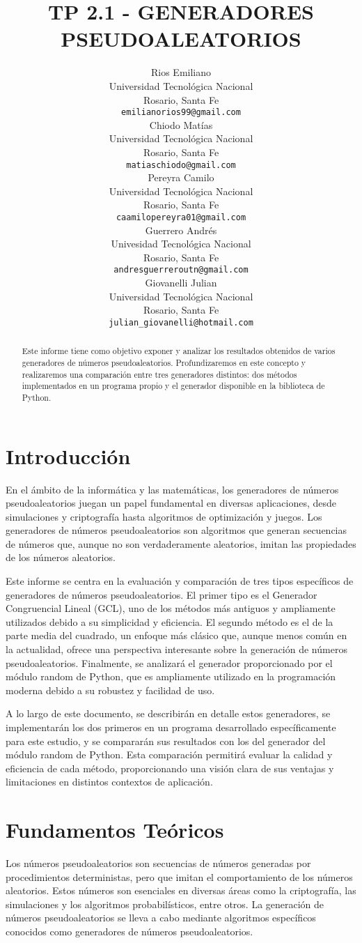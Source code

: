 \documentclass{article}
\title{TP 2.1 - GENERADORES PSEUDOALEATORIOS}
\author{
  Rios Emiliano\\
  Universidad Tecnológica Nacional\\
  Rosario, Santa Fe  \\
  \texttt{emilianorios99@gmail.com} \\
  \And
  Chiodo Matías\\
  Universidad Tecnológica Nacional\\
  Rosario, Santa Fe  \\
  \texttt{matiaschiodo@gmail.com} \\
  \And
  Pereyra Camilo\\
  Universidad Tecnológica Nacional\\
  Rosario, Santa Fe\\
  \texttt{caamilopereyra01@gmail.com} \\
  \And
  Guerrero Andrés\\
  Univesidad Tecnológica Nacional\\
  Rosario, Santa Fe \\
  \texttt {andresguerreroutn@gmail.com} \\
  \And
  Giovanelli Julian\\
  Universidad Tecnológica Nacional\\
  Rosario, Santa Fe  \\
  \texttt{julian\_giovanelli@hotmail.com} \\
}
\begin{document}
\maketitle
\begin{abstract}
Este informe tiene como objetivo exponer y analizar los resultados obtenidos de varios generadores de números pseudoaleatorios. Profundizaremos en este concepto y realizaremos una comparación entre tres generadores distintos: dos métodos implementados en un programa propio y el generador disponible en la biblioteca de Python.
\end{abstract}

\section{Introducción}

En el ámbito de la informática y las matemáticas, los generadores de números pseudoaleatorios juegan un papel fundamental en diversas aplicaciones, desde simulaciones y criptografía hasta algoritmos de optimización y juegos. Los generadores de números pseudoaleatorios son algoritmos que generan secuencias de números que, aunque no son verdaderamente aleatorios, imitan las propiedades de los números aleatorios.

Este informe se centra en la evaluación y comparación de tres tipos específicos de generadores de números pseudoaleatorios. El primer tipo es el Generador Congruencial Lineal (GCL), uno de los métodos más antiguos y ampliamente utilizados debido a su simplicidad y eficiencia. El segundo método es el de la parte media del cuadrado, un enfoque más clásico que, aunque menos común en la actualidad, ofrece una perspectiva interesante sobre la generación de números pseudoaleatorios. Finalmente, se analizará el generador proporcionado por el módulo random de Python, que es ampliamente utilizado en la programación moderna debido a su robustez y facilidad de uso.

A lo largo de este documento, se describirán en detalle estos generadores, se implementarán los dos primeros en un programa desarrollado específicamente para este estudio, y se compararán sus resultados con los del generador del módulo random de Python. Esta comparación permitirá evaluar la calidad y eficiencia de cada método, proporcionando una visión clara de sus ventajas y limitaciones en distintos contextos de aplicación.

\section{Fundamentos Teóricos}
Los números pseudoaleatorios son secuencias de números generadas por procedimientos deterministas, pero que imitan el comportamiento de los números aleatorios. Estos números son esenciales en diversas áreas como la criptografía, las simulaciones y los algoritmos probabilísticos, entre otros. La generación de números pseudoaleatorios se lleva a cabo mediante algoritmos específicos conocidos como generadores de números pseudoaleatorios.
\end{document}
